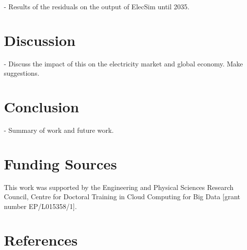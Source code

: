 \documentclass[final,3p,times,twocolumn,numbers]{elsarticle}
\begin{document}
- Results of the residuals on the output of ElecSim until 2035.\\

\section{Discussion}
\label{sec:discussion}

- Discuss the impact of this on the electricity market and global economy. Make suggestions.

\section{Conclusion}
\label{sec:conclusion}

- Summary of work and future work.

\section{Funding Sources}

This work was supported by the Engineering and Physical Sciences Research Council, Centre for Doctoral Training in Cloud Computing for Big Data [grant number EP/L015358/1].







   
  \section*{References}
  


%
%
%
\end{document}
